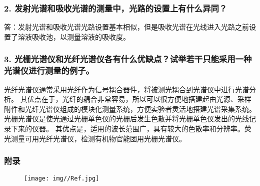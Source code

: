 \documentclass[12pt,a4paper,UTF8]{ctexart}
\begin{document}
\subsubsection*{2. 发射光谱和吸收光谱的测量中，光路的设置上有什么异同？}
答：发射光谱和吸收光谱光路设置基本相似，但是吸收光谱在光线进入光路之前设置了溶液吸收池，以测量溶液的吸收度。

\subsubsection*{3. 光栅光谱仪和光纤光谱仪各有什么优缺点？试举若干只能采用一种光谱仪进行测量的例子。}
光纤光谱仪通常采用光纤作为信号耦合器件，将被测光耦合到光谱仪中进行光谱分析。
其优点在于，光纤的耦合非常容易，所以可以很方便地搭建起由光源、采样附件和光纤光谱仪组成的模块化测量系统，方便实验者灵活地搭建光谱采集系统。
光栅光谱仪是使光通过光栅单色仪的光栅后发生色散并将光栅单色仪发出的光线记录下来的仪器。
其优点是，适用的波长范围广，具有较大的色散率和分辨率。荧光测量可用光纤光谱仪，检测有机物官能团用光栅光谱仪。

\subsubsection*{附录}
\begin{figure}[htbp]
	\centering
	\texttt{[image: img//Ref.jpg]}
\end{figure}
\end{document}
